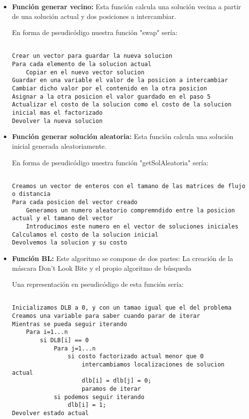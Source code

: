 \begin{itemize}
\begin{lstlisting}[language=SH]
	\end{lstlisting}
	\newpage
	\item \textbf{Función generar vecino:}	
	Esta función calcula una solución vecina a partir de una solución actual y dos posiciones a intercambiar.
	
	En forma de pseudicódigo nuestra función "swap" sería:
	
	\begin{lstlisting}[language=SH]

Crear un vector para guardar la nueva solucion
Para cada elemento de la solucion actual
	Copiar en el nuevo vector solucion
Guardar en una variable el valor de la posicion a intercambiar
Cambiar dicho valor por el contenido en la otra posicion
Asignar a la otra posicion el valor guardado en el paso 5 
Actualizar el costo de la solucion como el costo de la solucion inicial mas el factorizado
Devolver la nueva solucion

	\end{lstlisting}
	
		\item \textbf{Función generar solución aleatoria:}	
		Esta función calcula una solución inicial generada aleatoriamente.
		
		En forma de pseudicódigo nuestra función "getSolAleatoria" sería:
		
		\begin{lstlisting}[language=SH]
		
Creamos un vector de enteros con el tamano de las matrices de flujo o distancia
Para cada posicion del vector creado
	Generamos un numero aleatorio compremndido entre la posicion actual y el tamano del vector
	Introducimos este numero en el vector de soluciones iniciales
Calculamos el costo de la solucion inicial
Devolvemos la solucion y su costo
		\end{lstlisting}
\newpage
			\item \textbf{Función BL:}
		Este algoritmo se compone de dos partes: La creación de la máscara Don't Look Bite y el propio algoritmo de búsqueda

			Una representación en pseudicódigo de esta función sería:
			
					\begin{lstlisting}[language=SH]
					
Inicializamos DLB a 0, y con un tamao igual que el del problema
Creamos una variable para saber cuando parar de iterar
Mientras se pueda seguir iterando
	Para i=1...n
		si DLB[i] == 0
			Para j=1...n
				si costo factorizado actual menor que 0
					intercambiamos localizaciones de solucion actual
					dlb[i] = dlb[j] = 0;
					paramos de iterar
			si podemos seguir iterando
				dlb[i] = 1;
Devolver estado actual
					\end{lstlisting}

		
\end{itemize} 


